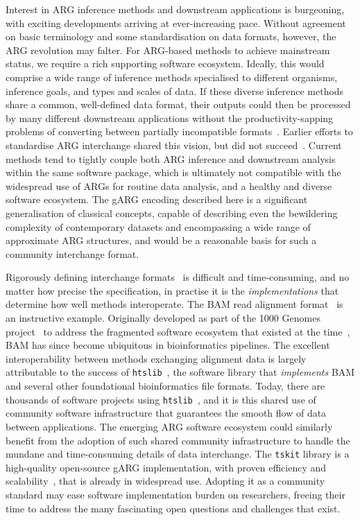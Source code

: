 \documentclass[9pt,twocolumn,twoside]{gsajnl}
\begin{document}
Interest in ARG inference methods and downstream applications is
burgeoning, with exciting developments arriving at ever-increasing pace.
Without agreement on basic terminology and some standardisation
on data formats, however, the ARG revolution may falter.
For ARG-based methods to achieve mainstream status, we require
a rich supporting software ecosystem.
Ideally, this would comprise a wide range of
inference methods specialised to different organisms,
inference goals, and types and scales of data.
If these diverse inference methods share a common,
well-defined data format, their outputs could then be
processed by many different downstream applications
without the productivity-sapping problems
of converting between partially incompatible
formats~\citep{excoffier2006computer}.
Earlier efforts to standardise ARG interchange shared this vision,
but did not succeed~\citep{cardona2008extended,mcgill2013graphml}.
Current methods tend to tightly couple both ARG inference and downstream
analysis within the same software package,
which is ultimately not compatible with the widespread use
of ARGs for routine data analysis, and a healthy and diverse software ecosystem.
The gARG encoding described here is a significant generalisation
of classical concepts, capable of describing even the bewildering complexity
of contemporary datasets and encompassing a wide range of approximate
ARG structures, and would be a reasonable basis for such a community
interchange format.

Rigorously defining interchange formats~\cite[e.g.][]{kelleher2019htsget}
is difficult and time-consuming,
and no matter how precise the specification, in practise
it is the \emph{implementations} that determine how well methods
interoperate. The BAM read alignment format~\citep{li2009sequence}
is an instructive example. Originally developed as part of the
1000 Genomes project~\citep{10002015global} to address the fragmented
software ecosystem that existed at the time~\citep{danecek2021twelve},
BAM has since become ubiquitous in bioinformatics pipelines.
The excellent interoperability between methods
exchanging alignment data is largely attributable to the
success of \texttt{htslib}~\citep{bonfield2021htslib}, the
software library that \emph{implements} BAM and several other
foundational bioinformatics file formats.
Today, there are thousands of software projects
using \texttt{htslib}~\citep{bonfield2021htslib},
and it is this shared use of community software
infrastructure that guarantees the smooth flow of data between
applications.
The emerging ARG software ecosystem could similarly benefit
from the adoption of such shared community infrastructure
to handle the mundane and time-consuming details of data interchange.
The \texttt{tskit} library 
is a high-quality open-source gARG implementation,
with proven efficiency and
scalability~\citep[e.g.][]{anderson2022genes,zhan2023towards},
that is already in widespread use.
Adopting it as a community standard may ease software implementation burden
on researchers, freeing their time to address the many fascinating open
questions and challenges that exist.
\end{document}
